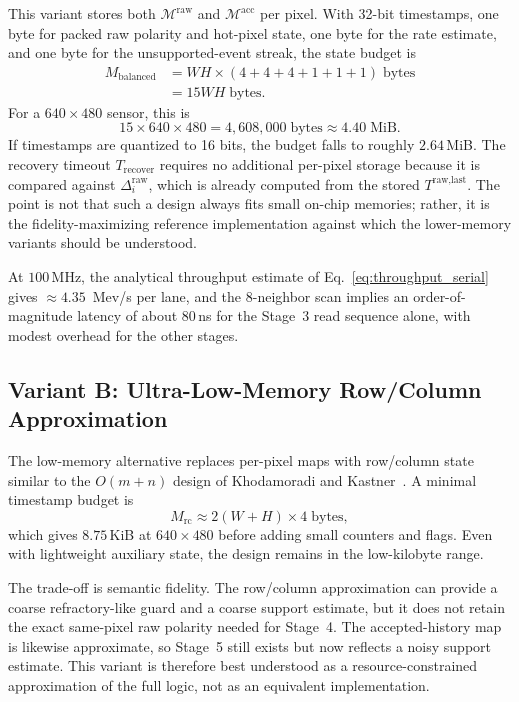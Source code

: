 \documentclass[a4paper,fleqn]{cas-dc}
\begin{document}
This variant stores both $\mathcal{M}^{\text{raw}}$ and $\mathcal{M}^{\text{acc}}$ per pixel. With 32-bit timestamps, one byte for packed raw polarity and hot-pixel state, one byte for the rate estimate, and one byte for the unsupported-event streak, the state budget is
\begin{equation}
\begin{aligned}
M_{\text{balanced}}
&= W H \times (4 + 4 + 4 + 1 + 1 + 1)\;\text{bytes} \\
&= 15 W H\;\text{bytes}.
\end{aligned}
\label{eq:mem_balanced}
\end{equation}
For a $640\times480$ sensor, this is
\[
15 \times 640 \times 480 = 4{,}608{,}000\;\text{bytes} \approx 4.40\;\text{MiB}.
\]
If timestamps are quantized to 16 bits, the budget falls to roughly $2.64$\,MiB. The recovery timeout $T_{\text{recover}}$ requires no additional per-pixel storage because it is compared against $\Delta_i^{\text{raw}}$, which is already computed from the stored $T^{\text{raw,last}}$. The point is not that such a design always fits small on-chip memories; rather, it is the fidelity-maximizing reference implementation against which the lower-memory variants should be understood.

At $100$\,MHz, the analytical throughput estimate of Eq.~\eqref{eq:throughput_serial} gives $\approx 4.35$~Mev/s per lane, and the 8-neighbor scan implies an order-of-magnitude latency of about $80$\,ns for the Stage~3 read sequence alone, with modest overhead for the other stages.

\subsection{Variant B: Ultra-Low-Memory Row/Column Approximation}
\label{sec:variant_lowmem}

The low-memory alternative replaces per-pixel maps with row/column state similar to the $O(m{+}n)$ design of Khodamoradi and Kastner~\citep{khodamoradi2018onoise}. A minimal timestamp budget is
\begin{equation}
M_{\text{rc}} \approx 2(W+H)\times 4\;\text{bytes},
\label{eq:mem_rc}
\end{equation}
which gives $8.75$\,KiB at $640\times480$ before adding small counters and flags. Even with lightweight auxiliary state, the design remains in the low-kilobyte range.

The trade-off is semantic fidelity. The row/column approximation can provide a coarse refractory-like guard and a coarse support estimate, but it does not retain the exact same-pixel raw polarity needed for Stage~4. The accepted-history map is likewise approximate, so Stage~5 still exists but now reflects a noisy support estimate. This variant is therefore best understood as a resource-constrained approximation of the full logic, not as an equivalent implementation.
\end{document}
